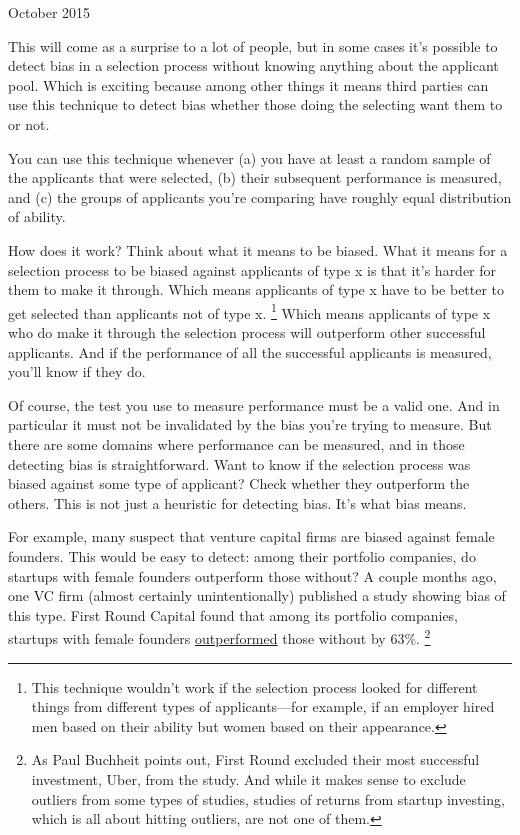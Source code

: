 \documentclass[12pt]{book}
\begin{document}
October 2015

This will come as a surprise to a lot of people, but in some cases it's
possible to detect bias in a selection process without knowing anything
about the applicant pool. Which is exciting because among other things
it means third parties can use this technique to detect bias whether
those doing the selecting want them to or not.

You can use this technique whenever (a) you have at least a random
sample of the applicants that were selected, (b) their subsequent
performance is measured, and (c) the groups of applicants you're
comparing have roughly equal distribution of ability.

How does it work? Think about what it means to be biased. What it means
for a selection process to be biased against applicants of type x is
that it's harder for them to make it through. Which means applicants of
type x have to be better to get selected than applicants not of type x.
\footnote{This technique wouldn't work if the selection process looked for
different things from different types of applicants---for example, if an
employer hired men based on their ability but women based on their
appearance.} Which means applicants of type x who do make it
through the selection process will outperform other successful
applicants. And if the performance of all the successful applicants is
measured, you'll know if they do.

Of course, the test you use to measure performance must be a valid one.
And in particular it must not be invalidated by the bias you're trying
to measure. But there are some domains where performance can be
measured, and in those detecting bias is straightforward. Want to know
if the selection process was biased against some type of applicant?
Check whether they outperform the others. This is not just a heuristic
for detecting bias. It's what bias means.

For example, many suspect that venture capital firms are biased against
female founders. This would be easy to detect: among their portfolio
companies, do startups with female founders outperform those without? A
couple months ago, one VC firm (almost certainly unintentionally)
published a study showing bias of this type. First Round Capital found
that among its portfolio companies, startups with female founders
\href{http://10years.firstround.com/\#one}{outperformed} those without
by 63\%. \footnote{As Paul Buchheit points out, First Round excluded their most
successful investment, Uber, from the study. And while it makes sense to
exclude outliers from some types of studies, studies of returns from
startup investing, which is all about hitting outliers, are not one of
them.}
\end{document}
